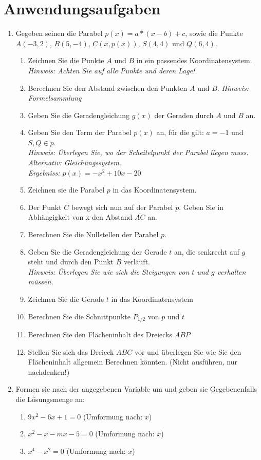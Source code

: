 \documentclass{scrartcl}
\begin{document}
	\section{Anwendungsaufgaben}
	\begin{enumerate}
		\item Gegeben seinen die Parabel $p(x) = a*(x-b)+c$, sowie die Punkte $A (-3,2)$, $B(5,-4)$, $C(x,p(x))$, $S(4,4)$ und  $Q(6,4)$.
			\begin{enumerate}
				\item Zeichnen Sie die Punkte $A$ und $B$ in ein passendes Koordinatensystem. \\ \emph{Hinweis: Achten Sie auf alle Punkte und deren Lage!}
				\item Berechnen Sie den Abstand zwischen den Punkten $A$ und $B$. \emph{Hinweis: Formelsammlung}
				\item Geben Sie die Geradengleichung $g(x)$ der Geraden durch $A$ und $B$ an.
				\item Geben Sie den Term der Parabel $p(x)$ an, für die gilt: $a=-1$ und $S,Q \in p$. \\ \emph{Hinweis: Überlegen Sie, wo der Scheitelpunkt der Parabel liegen muss. Alternativ: Gleichungssystem. \\ Ergebniss: $p(x) = -x^2 +10x-20$}
				\item Zeichnen sie die Parabel $p$ in das Koordinatensystem.
				\item Der Punkt $C$ bewegt sich nun auf der Parabel $p$. Geben Sie in Abhängigkeit von x den Abstand $\overline{AC}$ an.
				\item Berechnen Sie die Nullstellen der Parabel $p$.
				\item Geben Sie die Geradengleichung der Gerade $t$ an, die senkrecht auf $g$ steht und durch den Punkt $B$ verläuft. \\ \emph{Hinweis: Überlegen Sie wie sich die Steigungen von $t$ und $g$ verhalten müssen.}
				\item Zeichnen Sie die Gerade $t$ in das Koordinatensystem
				\item Berechnen Sie die Schnittpunkte $P_{1/2}$ von $p$ und $t$
				\item Berechnen Sie den Flächeninhalt des Dreiecks $ABP$
				\item Stellen Sie sich das Dreieck $ABC$ vor und überlegen Sie wie Sie den Flächeninhalt allgemein Berechnen könnten. (Nicht ausführen, nur nachdenken!)
			\end{enumerate}
		\item Formen sie nach der angegebenen Variable um und geben sie Gegebenenfalls die Lösungsmenge an:
			\begin{enumerate}
				\item $9x^2 - 6x + 1 = 0$ (Umformung nach: $x$)
				\item $x^2 - x - mx -5 = 0$ (Umformung nach: $x$)
				\item $x^4 - x^2 = 0$ (Umformung nach: $x$) 
			\end{enumerate}
	\end{enumerate}
			
\end{document}
